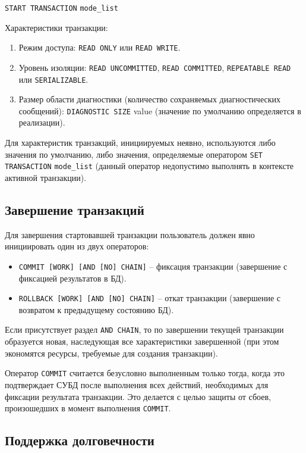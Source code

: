\documentclass[a4paper,12pt]{article}
\begin{document}
\texttt{START TRANSACTION} \texttt{mode\_list}

Характеристики транзакции:
\begin{enumerate}
    \item Режим доступа: \texttt{READ ONLY} или \texttt{READ WRITE}.
    \item Уровень изоляции: \texttt{READ UNCOMMITTED}, \texttt{READ COMMITTED}, \texttt{REPEATABLE READ} или \texttt{SERIALIZABLE}.
    \item Размер области диагностики (количество сохраняемых диагностических сообщений): \texttt{DIAGNOSTIC SIZE} value (значение по умолчанию определяется в реализации).
\end{enumerate}

Для характеристик транзакций, инициируемых неявно, используются либо значения по умолчанию, либо значения, определяемые оператором \texttt{SET TRANSACTION} \texttt{mode\_list} (данный оператор недопустимо выполнять в контексте активной транзакции).

\subsection{Завершение транзакций}

Для завершения стартовавшей транзакции пользователь должен явно инициировать один из двух операторов:
\begin{itemize}
    \item \texttt{COMMIT [WORK] [AND [NO] CHAIN]} – фиксация транзакции (завершение с фиксацией результатов в БД).
    \item \texttt{ROLLBACK [WORK] [AND [NO] CHAIN]} – откат транзакции (завершение с возвратом к предыдущему состоянию БД).
\end{itemize}

Если присутствует раздел \texttt{AND CHAIN}, то по завершении текущей транзакции образуется новая, наследующая все характеристики завершенной (при этом экономятся ресурсы, требуемые для создания транзакции).

Оператор \texttt{COMMIT} считается безусловно выполненным только тогда, когда это подтверждает СУБД после выполнения всех действий, необходимых для фиксации результата транзакции. Это делается с целью защиты от сбоев, произошедших в момент выполнения \texttt{COMMIT}.

\subsection{Поддержка долговечности}
\end{document}
